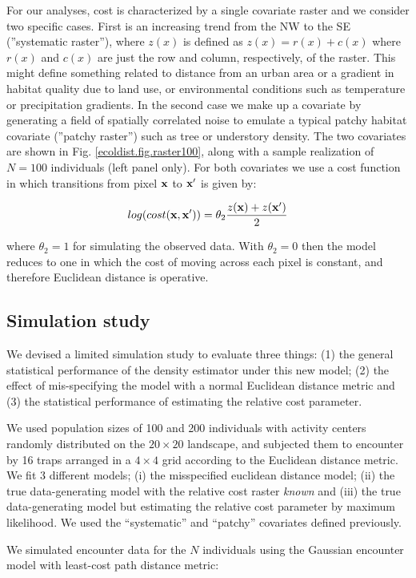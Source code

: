 \documentclass[12pt]{article}
\begin{document}
\begin{spacing}{1.8}
For our analyses, cost is characterized by a single covariate raster
and we consider two specific cases. First is an increasing trend from
the NW to the SE (''systematic raster''), where $z(x)$ is defined as
$z(x) = r(x) + c(x)$ where $r(x)$ and $c(x)$ are just the row and
column, respectively, of the raster.  This might define something
related to distance from an urban area or a gradient in habitat
quality due to land use, or environmental conditions such as
temperature or precipitation gradients.  In the second case we make up
a covariate by generating a field of spatially correlated noise to
emulate a typical patchy habitat covariate (''patchy raster'') such as
tree or understory density. The two covariates are shown in
Fig. \ref{ecoldist.fig.raster100}, along with a sample realization of
$N=100$ individuals (left panel only).  For both covariates we use a
cost function in which transitions from pixel ${\bf x}$ to ${\bf x}'$
is given by:

\[
 log(cost({\bf x},{\bf x}'))=  \theta_2 \frac{z({\bf x}) + z({\bf x}')}{2}
\]

{\flushleft where} $\theta_2 = 1$ for simulating the observed data.
 With $\theta_2=0$ then the
model reduces to one in which the cost of moving across each pixel is
constant, and therefore Euclidean distance is operative.

\subsection{Simulation study}

We devised a limited simulation study to evaluate three things: (1)
the general statistical performance of the density estimator under
this new model; (2) the effect of mis-specifying the model with a
normal Euclidean distance metric and (3) the statistical performance
of estimating the relative cost parameter.

We used population sizes of 100 and 200 individuals with activity
centers randomly distributed on the $20 \times 20$ landscape, and subjected them
to encounter by 16 traps arranged in a $4\times 4$ grid according to
the Euclidean distance metric. We fit 3 different models; (i) the
misspecified euclidean distance model; (ii) the true data-generating
model with the relative cost raster {\it known} and (iii) the true
data-generating model but estimating the relative cost parameter by
maximum likelihood.  We used the ``systematic'' and ``patchy''
covariates defined previously.

We simulated encounter data for the $N$ individuals using the Gaussian
encounter model with least-cost path distance metric:


\end{spacing}
\end{document}
